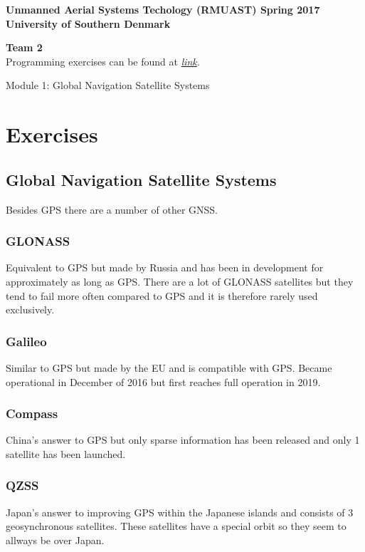 \documentclass[a4paper,10pt,fleqn]{article}
\begin{document}
\Large
\textbf{Unmanned Aerial Systems Techology (RMUAST) Spring 2017 \\ University of Southern Denmark}

\Large
\textbf{Team 2}
\normalsize
\\
Programming exercises can be found at \textit{\href{https://github.com/TobiasLundby/UAST}{link}.}

\vspace{3mm}

\LARGE Module 1: Global Navigation Satellite Systems 


\normalsize

\section{Exercises}

\subsection{Global Navigation Satellite Systems}
Besides GPS there are a number of other GNSS.

\subsubsection{GLONASS}
Equivalent to GPS but made by Russia and has been in development for approximately as long as GPS. There are a lot of GLONASS satellites  but they tend to fail more often compared to GPS and it is therefore rarely used exclusively.

\subsubsection{Galileo}
Similar to GPS but made by the EU and is compatible with GPS. Became operational in December of 2016 but first reaches full operation in 2019.

\subsubsection{Compass}
China's answer to GPS but only sparse information has been released and only 1 satellite has been launched.

\subsubsection{QZSS}
Japan's answer to improving GPS within the Japanese islands and consists of 3 geosynchronous satellites. These satellites have a special orbit so they seem to allways be over Japan.
\end{document}
